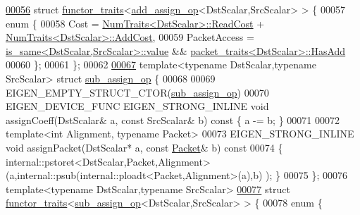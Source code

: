 \begin{DoxyCode}
\hyperlink{struct_eigen_1_1internal_1_1functor__traits_3_01add__assign__op_3_01_dst_scalar_00_01_src_scalar_01_4_01_4}{00056} \textcolor{keyword}{struct }\hyperlink{struct_eigen_1_1internal_1_1functor__traits}{functor\_traits}<\hyperlink{struct_eigen_1_1internal_1_1add__assign__op}{add\_assign\_op}<DstScalar,SrcScalar> > \{
00057   \textcolor{keyword}{enum} \{
00058     Cost = \hyperlink{group___core___module_struct_eigen_1_1_num_traits}{NumTraits<DstScalar>::ReadCost} + 
      \hyperlink{group___core___module_struct_eigen_1_1_num_traits}{NumTraits<DstScalar>::AddCost},
00059     PacketAccess = \hyperlink{struct_eigen_1_1internal_1_1is__same}{is\_same<DstScalar,SrcScalar>::value} && 
      \hyperlink{struct_eigen_1_1internal_1_1packet__traits}{packet\_traits<DstScalar>::HasAdd}
00060   \};
00061 \};
00062 
\hyperlink{struct_eigen_1_1internal_1_1sub__assign__op}{00067} \textcolor{keyword}{template}<\textcolor{keyword}{typename} DstScalar,\textcolor{keyword}{typename} SrcScalar> \textcolor{keyword}{struct }\hyperlink{struct_eigen_1_1internal_1_1sub__assign__op}{sub\_assign\_op} \{
00068 
00069   EIGEN\_EMPTY\_STRUCT\_CTOR(\hyperlink{struct_eigen_1_1internal_1_1sub__assign__op}{sub\_assign\_op})
00070   EIGEN\_DEVICE\_FUNC EIGEN\_STRONG\_INLINE \textcolor{keywordtype}{void} assignCoeff(DstScalar& a, \textcolor{keyword}{const} SrcScalar& b)\textcolor{keyword}{ const }\{ a -= b; 
      \}
00071   
00072   \textcolor{keyword}{template}<\textcolor{keywordtype}{int} Alignment, \textcolor{keyword}{typename} Packet>
00073   EIGEN\_STRONG\_INLINE \textcolor{keywordtype}{void} assignPacket(DstScalar* a, \textcolor{keyword}{const} \hyperlink{union_eigen_1_1internal_1_1_packet}{Packet}& b)\textcolor{keyword}{ const}
00074 \textcolor{keyword}{  }\{ internal::pstoret<DstScalar,Packet,Alignment>(a,internal::psub(internal::ploadt<Packet,Alignment>(a),b)
      ); \}
00075 \};
00076 \textcolor{keyword}{template}<\textcolor{keyword}{typename} DstScalar,\textcolor{keyword}{typename} SrcScalar>
\hyperlink{struct_eigen_1_1internal_1_1functor__traits_3_01sub__assign__op_3_01_dst_scalar_00_01_src_scalar_01_4_01_4}{00077} \textcolor{keyword}{struct }\hyperlink{struct_eigen_1_1internal_1_1functor__traits}{functor\_traits}<\hyperlink{struct_eigen_1_1internal_1_1sub__assign__op}{sub\_assign\_op}<DstScalar,SrcScalar> > \{
00078   \textcolor{keyword}{enum} \{

\end{DoxyCode}
